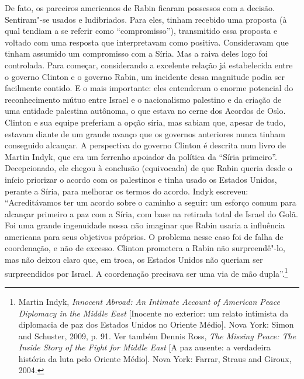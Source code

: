 De fato, os parceiros americanos de Rabin ficaram possessos com a
decisão. Sentiram"-se usados e ludibriados. Para eles, tinham recebido
uma proposta (à qual tendiam a se referir como ``compromisso''),
transmitido essa proposta e voltado com uma resposta que interpretavam
como positiva. Consideravam que tinham assumido um compromisso com a
Síria. Mas a raiva deles logo foi controlada. Para começar, considerando
a excelente relação já estabelecida entre o governo Clinton e o governo
Rabin, um incidente dessa magnitude podia ser facilmente contido. E o
mais importante: eles entenderam o enorme potencial do reconhecimento
mútuo entre Israel e o nacionalismo palestino e da criação de uma
entidade palestina autônoma, o que estava no cerne dos Acordos de Oslo.
Clinton e sua equipe preferiam a opção síria, mas sabiam que, apesar de
tudo, estavam diante de um grande avanço que os governos anteriores
nunca tinham conseguido alcançar. A perspectiva do governo Clinton é
descrita num livro de Martin Indyk, que era um ferrenho apoiador da
política da ``Síria primeiro''. Decepcionado, ele chegou à conclusão
(equivocada) de que Rabin queria desde o início priorizar o acordo com
os palestinos e tinha usado os Estados Unidos, perante a Síria, para
melhorar os termos do acordo. Indyk escreveu: ``Acreditávamos ter um
acordo sobre o caminho a seguir: um esforço comum para alcançar primeiro
a paz com a Síria, com base na retirada total de Israel do Golã. Foi uma
grande ingenuidade nossa não imaginar que Rabin usaria a influência
americana para seus objetivos próprios. O problema nesse caso foi de
falha de coordenação, e não de excesso. Clinton prometera a Rabin não
surpreendê"-lo, mas não deixou claro que, em troca, os Estados Unidos não
queriam ser surpreendidos por Israel. A coordenação precisava ser uma
via de mão dupla''.\footnote{Martin Indyk, \emph{Innocent Abroad: An
  Intimate Account of American Peace Diplomacy in the Middle East} 
  {[}Inocente no exterior: um relato intimista da diplomacia de paz
  dos Estados Unidos no Oriente Médio{]}. Nova
  York: Simon and Schuster, 2009, p. 91. Ver também Dennis Ross, \emph{The
  Missing Peace: The Inside Story of the Fight for Middle East} 
  {[}A paz ausente: a verdadeira história da luta pelo Oriente Médio{]}.
  Nova York: Farrar, Straus and Giroux, 2004.}

